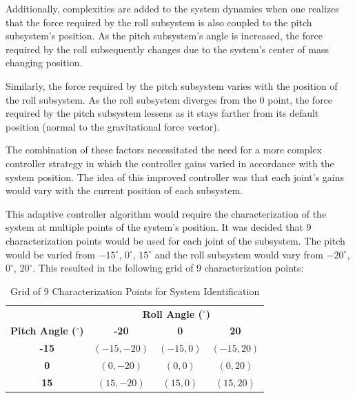 Additionally, complexities are added to the system dynamics when one realizes that the force required by the roll subsystem is also coupled to the pitch subsystem's position. As the pitch subsystem's angle is increased, the force required by the roll subsequently changes due to the system's center of mass changing position.

Similarly, the force required by the pitch subsystem varies with the position of the roll subsystem. As the roll subsystem diverges from the 0 point, the force required by the pitch subsystem lessens as it stays farther from its default position (normal to the gravitational force vector).

The combination of these factors necessitated the need for a more complex controller strategy in which the controller gains varied in accordance with the system position. The idea of this improved controller was that each joint's gains would vary with the current position of each subsystem.

This adaptive controller algorithm would require the characterization of the system at multiple points of the system's position. It was decided that 9 characterization points would be used for each joint of the subsystem. The pitch would be varied from $-15^\circ$, $0^\circ$, $15^\circ$ and the roll subsystem would vary from $-20^\circ$, $0^\circ$, $20^\circ$. This resulted in the following grid of 9 characterization points:

\begin{table}[htbp]
    \centering
    \caption{Grid of 9 Characterization Points for System Identification}
    \label{tab:characterization_points}
    \begin{tabular}{c|ccc} %
        \multicolumn{1}{c}{} & \multicolumn{3}{c}{\textbf{Roll Angle ($^\circ$)}} \\ %
        \cmidrule(lr){2-4} %
        \textbf{Pitch Angle ($^\circ$)} & \textbf{-20} & \textbf{0} & \textbf{20} \\ %
        \midrule %
        \textbf{-15} & $(-15, -20)$ & $(-15, 0)$ & $(-15, 20)$ \\
        \textbf{0}   & $(0, -20)$   & $(0, 0)$   & $(0, 20)$   \\
        \textbf{15}  & $(15, -20)$  & $(15, 0)$  & $(15, 20)$  \\
        \bottomrule
    \end{tabular}
\end{table}


